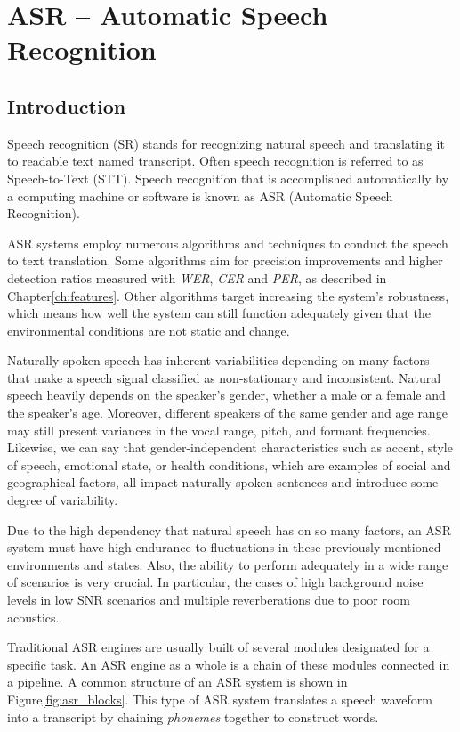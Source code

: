 \chapter{ASR -- Automatic Speech Recognition}\label{ch:asr_ch}
\section{Introduction}
Speech recognition (SR) stands for recognizing 
natural speech and translating 
it to readable text named transcript.
Often speech recognition is referred to as Speech-to-Text (STT). 
Speech recognition 
that is accomplished 
automatically by a computing machine or 
software is known as ASR (Automatic Speech Recognition).

ASR systems employ numerous algorithms 
and techniques to conduct the speech to text translation.
Some algorithms aim for precision improvements
and higher detection ratios measured with \emph{WER},
\emph{CER}
and \emph{PER},
as described in Chapter\;\ref{ch:features}.
Other algorithms target increasing
the system's robustness, which means
how well the system can still function adequately
given that the environmental conditions
are not static and change.

Naturally spoken speech has inherent 
variabilities depending on many 
factors that make a speech signal 
classified as non-stationary and inconsistent. 
Natural speech heavily depends on the speaker's gender, 
whether a male or a female and the speaker's age. 
Moreover, different speakers of the same 
gender and age range may still present variances 
in the vocal range, pitch, and formant frequencies.
Likewise, we can say that gender-independent 
characteristics such as accent, style of speech, emotional state, 
or health conditions, 
which are examples of social and geographical factors, 
all impact naturally spoken sentences and 
introduce some degree of variability.

Due to the high dependency that natural speech has on so many factors, 
an ASR system must have high endurance to fluctuations in these 
previously mentioned environments and states. Also, the ability to perform adequately in a wide range of scenarios is very crucial.  
In particular, the cases of high background noise levels in low SNR scenarios and multiple reverberations due to poor room acoustics.

Traditional ASR engines 
are usually built of several 
modules designated for a specific task.
An ASR engine as a whole is a chain of these modules connected in a pipeline. 
A common structure of an ASR system
is shown in Figure\;\ref{fig:asr_blocks}. This type
of ASR system translates a speech waveform into a transcript
by chaining \emph{phonemes} together to construct words.

